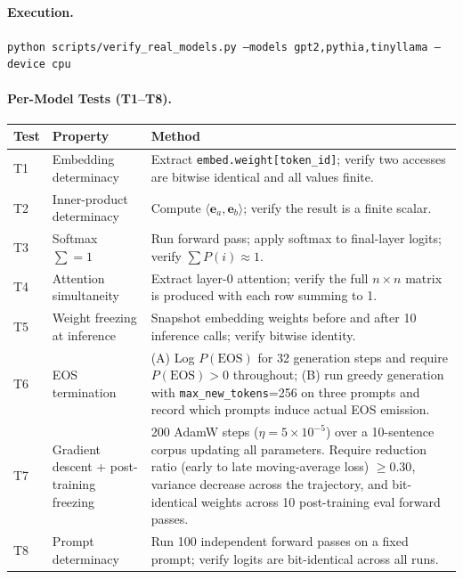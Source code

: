\documentclass[a4paper,twocolumn,11pt]{article}
\begin{document}
\paragraph{Execution.}  \texttt{python scripts/verify\_real\_models.py --models gpt2,pythia,tinyllama --device cpu}

\paragraph{Per-Model Tests (T1--T8).}

\begin{center}
\begin{tabular}{@{}p{}p{}p{}@{}}
\toprule
Test & Property & Method \\
\midrule
T1 & Embedding determinacy & Extract \texttt{embed.weight[token\_id]}; verify two accesses are bitwise identical and all values finite. \\
T2 & Inner-product determinacy & Compute $\langle \mathbf{e}_a, \mathbf{e}_b \rangle$; verify the result is a finite scalar. \\
T3 & Softmax $\sum = 1$ & Run forward pass; apply softmax to final-layer logits; verify $\sum P(i) \approx 1$. \\
T4 & Attention simultaneity & Extract layer-0 attention; verify the full $n \times n$ matrix is produced with each row summing to 1. \\
T5 & Weight freezing at inference & Snapshot embedding weights before and after 10 inference calls; verify bitwise identity. \\
T6 & EOS termination & (A) Log $P(\mathrm{EOS})$ for 32 generation steps and require $P(\mathrm{EOS}) > 0$ throughout; (B) run greedy generation with \texttt{max\_new\_tokens}=256 on three prompts and record which prompts induce actual EOS emission. \\
T7 & Gradient descent + post-training freezing & 200 AdamW steps ($\eta = 5 \times 10^{-5}$) over a 10-sentence corpus updating all parameters. Require reduction ratio (early to late moving-average loss) $\geq 0.30$, variance decrease across the trajectory, and bit-identical weights across 10 post-training eval forward passes. \\
T8 & Prompt determinacy & Run 100 independent forward passes on a fixed prompt; verify logits are bit-identical across all runs. \\
\bottomrule
\end{tabular}
\end{center}
\end{document}

